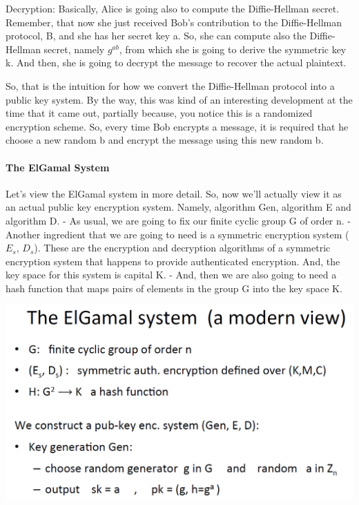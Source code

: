 \documentclass[11pt]{article}
\makeatletter
\def\maxwidth{\ifdim\Gin@nat@width>\linewidth\linewidth
    \else\Gin@nat@width\fi}
\let\Oldincludegraphics\includegraphics
\renewcommand{\includegraphics}[1]{\Oldincludegraphics[width=.8\maxwidth]{#1}}
\makeatother
\begin{document}
Decryption: Basically, Alice is going also to compute the Diffie-Hellman
secret. Remember, that now she just received Bob's contribution to the
Diffie-Hellman protocol, B, and she has her secret key a. So, she can
compute also the Diffie-Hellman secret, namely \(g^{ab}\), from which
she is going to derive the symmetric key k. And then, she is going to
decrypt the message to recover the actual plaintext.

So, that is the intuition for how we convert the Diffie-Hellman protocol
into a public key system. By the way, this was kind of an interesting
development at the time that it came out, partially because, you notice
this is a randomized encryption scheme. So, every time Bob encrypts a
message, it is required that he choose a new random b and encrypt the
message using this new random b.

\hypertarget{the-elgamal-system}{%
\paragraph{The ElGamal System}\label{the-elgamal-system}}

Let's view the ElGamal system in more detail. So, now we'll actually
view it as an actual public key encryption system. Namely, algorithm
Gen, algorithm E and algorithm D. - As usual, we are going to fix our
finite cyclic group G of order n. - Another ingredient that we are going
to need is a symmetric encryption system (\(E_{s}\), \(D_{s}\)). These
are the encryption and decryption algorithms of a symmetric encryption
system that happens to provide authenticated encryption. And, the key
space for this system is capital K. - And, then we are also going to
need a hash function that maps pairs of elements in the group G into the
key space K.

\includegraphics{./Images/ElGamalSystem.png}
\end{document}
